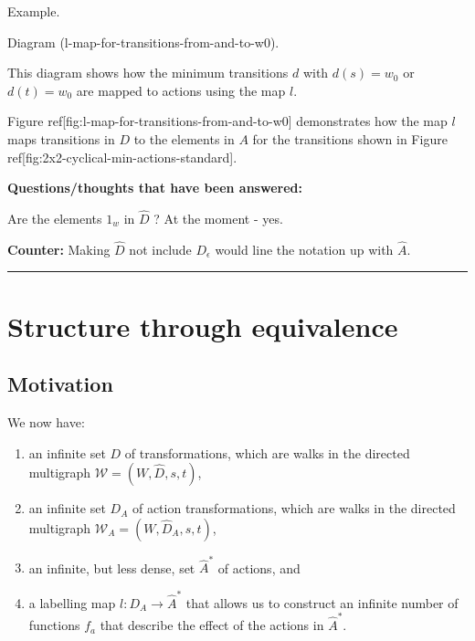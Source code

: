 {\begin{compactitem}
        \item Example.
        \begin{compactitem}
            \item Diagram (l-map-for-transitions-from-and-to-w0).
            \begin{compactitem}
                \item This diagram shows how the minimum transitions $d$ with $d(s) = w_{0}$ or $d(t)= w_{0}$ are mapped to actions using the map $l$.
                \item Figure ref[fig:l-map-for-transitions-from-and-to-w0] demonstrates how the map $l$ maps transitions in $D$ to the elements in $A$ for the transitions shown in Figure ref[fig:2x2-cyclical-min-actions-standard].
            \end{compactitem}
        \end{compactitem}
    \end{compactitem}

    \textbf{Questions/thoughts that have been answered:}
    \begin{compactitem}
        \item Are the elements $1_{w}$ in $\hat{D}$ ? At the moment - yes.
        \begin{compactitem}
            \item \textbf{Counter:} Making $\hat{D}$ not include $D_{\epsilon}$ would line the notation up with $\hat{A}$.
        \end{compactitem}
    \end{compactitem}

    \noindent\rule{\textwidth}{1mm}
}

\section{Structure through equivalence}
\subsection{Motivation}

We now have:
\begin{enumerate}[(1)]
    \item an infinite set $D$ of transformations, which are walks in the directed multigraph $\mathscr{W}=(W, \hat{D}, s, t)$,

    \item an infinite set $D_{A}$ of action transformations, which are walks in the directed multigraph $\mathscr{W}_{A}=(W, \hat{D}_{A}, s, t)$,

    \item an infinite, but less dense, set $\hat{A}^{\ast}$ of actions, and

    \item a labelling map $l: D_{A} \to \hat{A}^{\ast}$ that allows us to construct an infinite number of functions $f_{a}$ that describe the effect of the actions in $\hat{A}^{\ast}$.
\end{enumerate}

